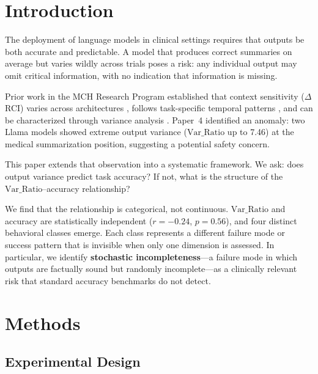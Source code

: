 \documentclass[11pt,a4paper]{article}
\begin{document}
\section{Introduction}

The deployment of language models in clinical settings requires that outputs be both accurate and predictable. A model that produces correct summaries on average but varies wildly across trials poses a risk: any individual output may omit critical information, with no indication that information is missing.

Prior work in the MCH Research Program established that context sensitivity ($\Delta$RCI) varies across architectures \citep{laxman2026paper1,laxman2026paper2}, follows task-specific temporal patterns \citep{laxman2026paper3}, and can be characterized through variance analysis \citep{laxman2026paper4}. Paper~4 identified an anomaly: two Llama models showed extreme output variance ($\text{Var\_Ratio}$ up to 7.46) at the medical summarization position, suggesting a potential safety concern.

This paper extends that observation into a systematic framework. We ask: does output variance predict task accuracy? If not, what is the structure of the $\text{Var\_Ratio}$--accuracy relationship?

We find that the relationship is categorical, not continuous. $\text{Var\_Ratio}$ and accuracy are statistically independent ($r = -0.24$, $p = 0.56$), and four distinct behavioral classes emerge. Each class represents a different failure mode or success pattern that is invisible when only one dimension is assessed. In particular, we identify \textbf{stochastic incompleteness}---a failure mode in which outputs are factually sound but randomly incomplete---as a clinically relevant risk that standard accuracy benchmarks do not detect.

\section{Methods}

\subsection{Experimental Design}
\end{document}
